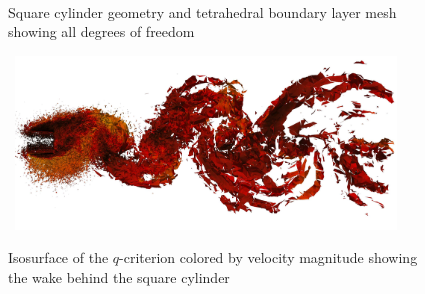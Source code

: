 \begin{figure}[h] \tt
\centering
{}
\caption{Square cylinder geometry and tetrahedral boundary layer mesh showing all degrees of freedom}
\label{sqcylmesh}
\end{figure}

\begin{figure}[h] \tt
\centering
\includegraphics[width=0.9\textwidth]{sqcyl-tet-wsm-newwallfn-coarse3-qcrit-010-velomag.pdf}
\caption{Isosurface of the $q$-criterion colored by velocity magnitude showing the wake behind the square cylinder}
\label{sqcylqcrit}
\end{figure}

